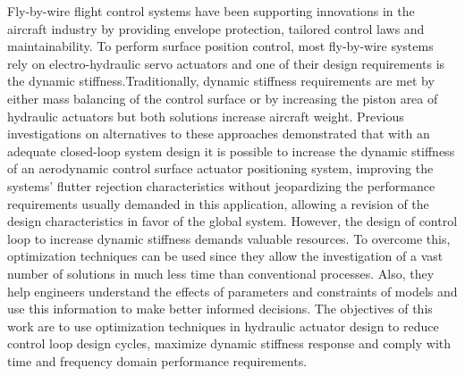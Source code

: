 Fly-by-wire flight control systems have been supporting innovations in the aircraft industry by providing envelope protection, tailored control laws and maintainability. To perform surface position control, most fly-by-wire systems rely on electro-hydraulic servo actuators and one of their design requirements is the dynamic stiffness.Traditionally, dynamic stiffness requirements are met by either mass balancing of the control surface or by increasing the piston area of hydraulic actuators but both solutions increase aircraft weight. Previous investigations on alternatives to these approaches demonstrated that with an adequate closed-loop system design it is possible to increase the dynamic stiffness of an aerodynamic control surface actuator positioning system, improving the systems' flutter rejection characteristics without jeopardizing the performance requirements usually demanded in this application, allowing a revision of the design characteristics in favor of the global system. However, the design of control loop to increase dynamic stiffness demands valuable resources. To overcome this, optimization techniques can be used since they allow the investigation of a vast number of solutions in much less time than conventional processes. Also, they help engineers understand the effects of parameters and constraints of models and use this information to make better informed decisions. The objectives of this work are to use optimization techniques in hydraulic actuator design to reduce control loop design cycles, maximize dynamic stiffness response and comply with time and frequency domain performance requirements.